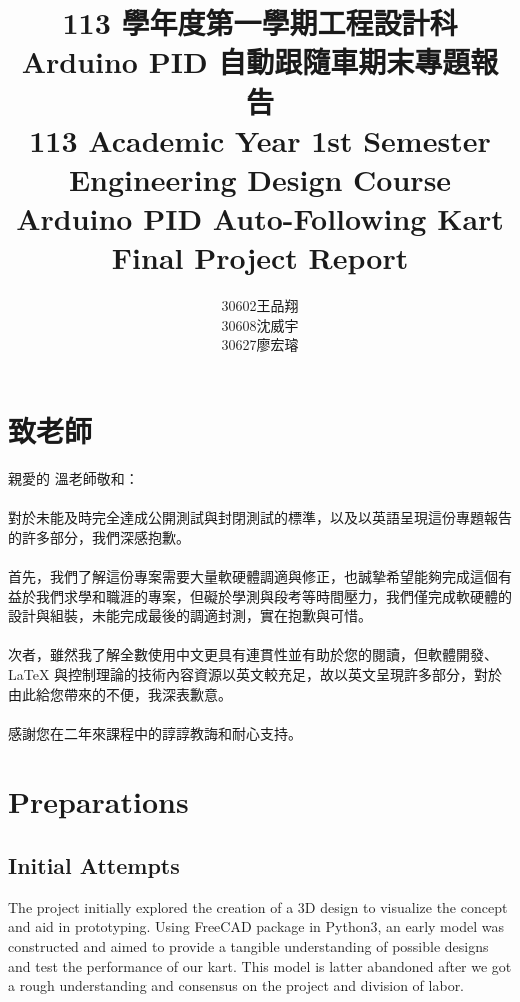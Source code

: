 \documentclass[a4paper,12pt]{report}
\begin{document}
\title{
\Large 113 學年度第一學期工程設計科\\
\huge Arduino PID 自動跟隨車期末專題報告\\
\Large 113 Academic Year 1st Semester Engineering Design Course\\
\huge Arduino PID Auto-Following Kart Final Project Report
}
\author{30602王品翔\\30608沈威宇\\30627廖宏璿}
\date{\temtoday}
\titletocdoc
\section{致老師}
親愛的 溫老師敬和：\\\\
對於未能及時完全達成公開測試與封閉測試的標準，以及以英語呈現這份專題報告的許多部分，我們深感抱歉。\\\\
首先，我們了解這份專案需要大量軟硬體調適與修正，也誠摯希望能夠完成這個有益於我們求學和職涯的專案，但礙於學測與段考等時間壓力，我們僅完成軟硬體的設計與組裝，未能完成最後的調適封測，實在抱歉與可惜。\\\\
次者，雖然我了解全數使用中文更具有連貫性並有助於您的閱讀，但軟體開發、\LaTeX{} 與控制理論的技術內容資源以英文較充足，故以英文呈現許多部分，對於由此給您帶來的不便，我深表歉意。\\\\
感謝您在二年來課程中的諄諄教誨和耐心支持。
\nthm\section{Preparations}
\subsection{Initial Attempts}
The project initially explored the creation of a 3D design to visualize the concept and aid in prototyping. Using FreeCAD package in Python3, an early model was constructed and aimed to provide a tangible understanding of possible designs and test the performance of our kart. This model is latter abandoned after we got a rough understanding and consensus on the project and division of labor.
\end{document}
